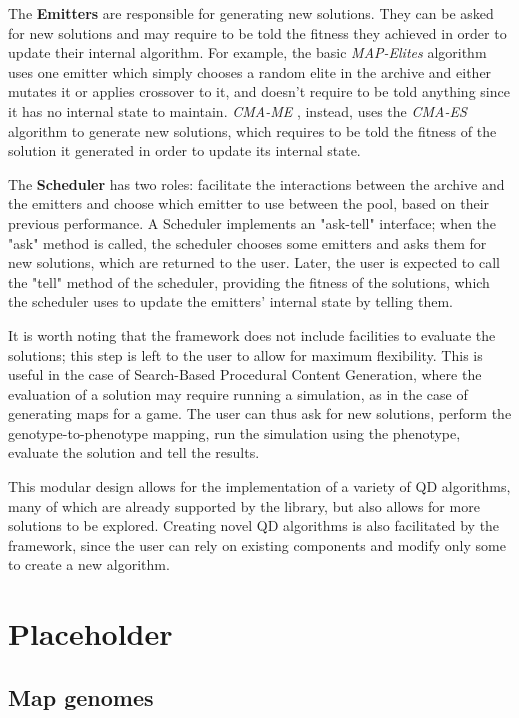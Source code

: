 \documentclass{Configuration_Files/PoliMi3i_thesis}
\begin{document}
The \textbf{Emitters} are responsible for generating new solutions. They can be asked for new solutions and may require to be told the fitness they achieved in order to update their internal algorithm. 
For example, the basic \textit{MAP-Elites} \cite{mouret_illuminating_2015} algorithm uses one emitter which simply chooses a random elite in the archive and either mutates it or applies crossover to it, and doesn't require to be told anything since it has no internal state to maintain. 
\textit{CMA-ME} \cite{fontaine_covariance_2020}, instead, uses the \textit{CMA-ES} algorithm to generate new solutions, which requires to be told the fitness of the solution it generated in order to update its internal state.

The \textbf{Scheduler} has two roles: facilitate the interactions between the archive and the emitters and choose which emitter to use between the pool, based on their previous performance.
A Scheduler implements an "ask-tell" interface; when the "ask" method is called, the scheduler chooses some emitters and asks them for new solutions, which are returned to the user. Later, the user is expected to call the "tell" method of the scheduler, providing the fitness of the solutions, which the scheduler uses to update the emitters' internal state by telling them.

It is worth noting that the framework does not include facilities to evaluate the solutions; this step is left to the user to allow for maximum flexibility. This is useful in the case of Search-Based Procedural Content Generation, where the evaluation of a solution may require running a simulation, as in the case of generating maps for a game. The user can thus ask for new solutions, perform the genotype-to-phenotype mapping, run the simulation using the phenotype, evaluate the solution and tell the results. 

This modular design allows for the implementation of a variety of QD algorithms, many of which are already supported by the library, but also allows for more solutions to be explored. Creating novel QD algorithms is also facilitated by the framework, since the user can rely on existing components and modify only some to create a new algorithm.

\chapter{Placeholder}

\section{Map genomes}
\label{sec:map_genomes}
\end{document}

